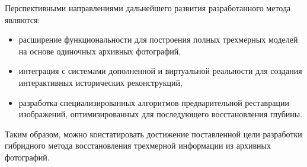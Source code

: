 Перспективными направлениями дальнейшего развития разработанного метода являются:
\begin{itemize}
    \item расширение функциональности для построения полных трехмерных моделей на основе одиночных архивных фотографий,
    \item интеграция с системами дополненной и виртуальной реальности для создания интерактивных исторических реконструкций,
    \item разработка специализированных алгоритмов предварительной реставрации изображений, оптимизированных для последующего восстановления глубины.
\end{itemize}

Таким образом, можно констатировать достижение поставленной цели разработки гибридного метода восстановления трехмерной информации из архивных фотографий.

